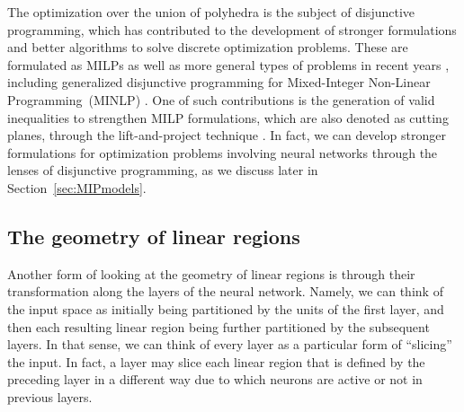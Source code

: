 The optimization over the union of polyhedra is the subject of disjunctive programming, 
which has contributed to the development of stronger formulations and better algorithms to solve discrete optimization problems. These are formulated as MILPs as well as more general types of problems in recent years \citep{DPBook}, including generalized disjunctive programming for Mixed-Integer Non-Linear Programming~(MINLP) \citep{gdp1994first,gdp2012survey}. 
One of such contributions is the generation of valid inequalities to strengthen MILP formulations, which are also denoted as cutting planes, through the lift-and-project technique \citep{CGLP1,CGLP2}. 
In fact, we can develop stronger formulations for optimization problems involving neural networks through the lenses of disjunctive programming, as we discuss later in Section~\ref{sec:MIPmodels}.


\subsection{The geometry of linear regions}\label{sec:geometry}

Another form of looking at the geometry of linear regions is through their transformation along the layers of the neural network. Namely, we can think of the input space as initially being partitioned by the units of the first layer, and then each resulting linear region being further partitioned by the subsequent layers. 
In that sense, we can think of every layer as a particular form of ``slicing'' the input. 
In fact, a layer may slice each linear region that is defined by the preceding layer in a different way due to which neurons are active or not in previous layers.  

